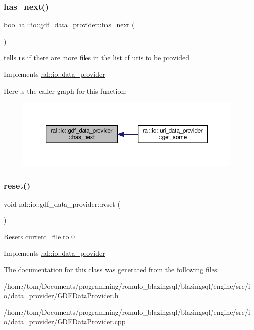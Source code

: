 \subsubsection{\texorpdfstring{has\+\_\+next()}{has\_next()}}
{\footnotesize\ttfamily bool ral\+::io\+::gdf\+\_\+data\+\_\+provider\+::has\+\_\+next (\begin{DoxyParamCaption}{ }\end{DoxyParamCaption})\hspace{0.3cm}{\ttfamily [virtual]}}

tells us if there are more files in the list of uris to be provided 

Implements \hyperlink{classral_1_1io_1_1data__provider_a92176228bbef65093853e2e2165a6d71}{ral\+::io\+::data\+\_\+provider}.

Here is the caller graph for this function\+:\nopagebreak
\begin{figure}[H]
\begin{center}
\leavevmode
\includegraphics[width=350pt]{classral_1_1io_1_1gdf__data__provider_af7ad84e9da11d439efe9328db3531855_icgraph}
\end{center}
\end{figure}
\mbox{\label{classral_1_1io_1_1gdf__data__provider_a6bd49396fc1bdeacd68566915e29a15f}} 
\subsubsection{\texorpdfstring{reset()}{reset()}}
{\footnotesize\ttfamily void ral\+::io\+::gdf\+\_\+data\+\_\+provider\+::reset (\begin{DoxyParamCaption}{ }\end{DoxyParamCaption})\hspace{0.3cm}{\ttfamily [virtual]}}

Resets current\+\_\+file to 0 

Implements \hyperlink{classral_1_1io_1_1data__provider_ab762cbdb9fd702a61b48785c84e91536}{ral\+::io\+::data\+\_\+provider}.



The documentation for this class was generated from the following files\+:\begin{DoxyCompactItemize}
\item 
/home/tom/\+Documents/programming/romulo\+\_\+blazingsql/blazingsql/engine/src/io/data\+\_\+provider/G\+D\+F\+Data\+Provider.\+h\item 
/home/tom/\+Documents/programming/romulo\+\_\+blazingsql/blazingsql/engine/src/io/data\+\_\+provider/G\+D\+F\+Data\+Provider.\+cpp\end{DoxyCompactItemize}
